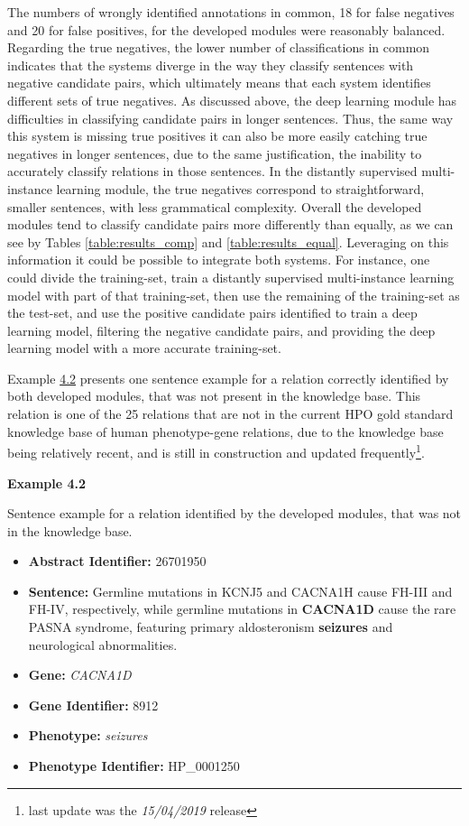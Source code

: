 The numbers of wrongly identified annotations in common, 18 for false negatives and 20 for false positives, for the developed modules were reasonably balanced. Regarding the true negatives, the lower number of classifications in common indicates that the systems diverge in the way they classify sentences with negative candidate pairs, which ultimately means that each system identifies different sets of true negatives. As discussed above, the deep learning module has difficulties in classifying candidate pairs in longer sentences. Thus, the same way this system is missing true positives it can also be more easily catching true negatives in longer sentences, due to the same justification, the inability to accurately classify relations in those sentences. In the distantly supervised multi-instance learning module, the true negatives correspond to straightforward, smaller sentences, with less grammatical complexity. Overall the developed modules tend to classify candidate pairs more differently than equally, as we can see by Tables \ref{table:results_comp} and \ref{table:results_equal}. Leveraging on this information it could be possible to integrate both systems. For instance, one could divide the training-set, train a distantly supervised multi-instance learning model with part of that training-set, then use the remaining of the training-set as the test-set, and use the positive candidate pairs identified to train a deep learning model, filtering the negative candidate pairs, and providing the deep learning model with a more accurate training-set.

Example \hyperlink{ex4.2}{4.2} presents one sentence example for a relation correctly identified by both developed modules, that was not present in the knowledge base. This relation is one of the 25 relations that are not in the current HPO gold standard knowledge base of human phenotype-gene relations, due to the knowledge base being relatively recent, and is still in construction and updated frequently\footnote{last update was the \textit{15/04/2019} release}.

\bigskip


\hypertarget{ex4.2}{\textbf{Example 4.2}} Sentence example for a relation identified by the developed modules, that was not in the knowledge base. 

\begin{itemize}

\item\textbf{Abstract Identifier:} 26701950
\item\textbf{Sentence:} Germline mutations in KCNJ5 and CACNA1H cause FH-III and FH-IV, respectively, while germline mutations in \textbf{CACNA1D} cause the rare PASNA syndrome, featuring primary aldosteronism \textbf{seizures} and neurological abnormalities.
\item\textbf{Gene:} \textit{CACNA1D}
\item\textbf{Gene Identifier:} 8912
\item\textbf{Phenotype:} \textit{seizures}
\item\textbf{Phenotype Identifier:} HP\_0001250

\end{itemize}

